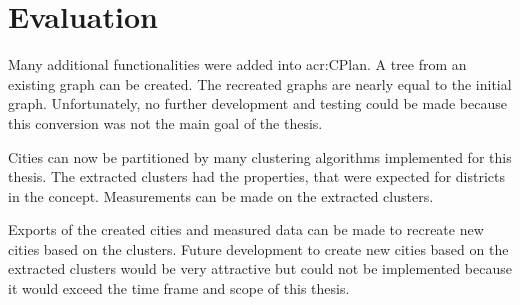 \chapter{Evaluation}
Many additional functionalities were added into \acrshort{acr:CPlan}. A tree from an existing graph can be created. The recreated graphs are nearly equal to the initial graph. Unfortunately, no further development and testing could be made because this conversion was not the main goal of the thesis.

Cities can now be partitioned by many clustering algorithms implemented for this thesis. The extracted clusters had the properties, that were expected for districts in the concept. Measurements can be made on the extracted clusters.

Exports of the created cities and measured data can be made to recreate new cities based on the clusters. Future development to create new cities based on the extracted clusters would be very attractive but could not be implemented because it would exceed the time frame and scope of this thesis.
